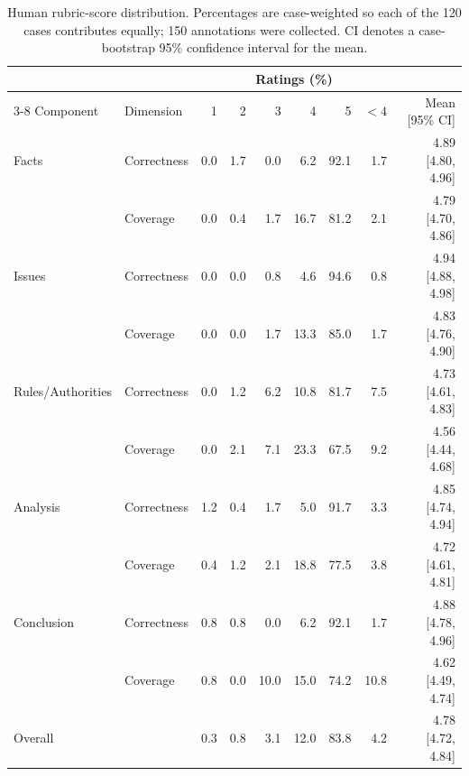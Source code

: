 \begin{table}[t]
\centering
\scriptsize
\setlength{\tabcolsep}{4pt}
\caption{Human rubric-score distribution. Percentages are case-weighted so each of the 120 cases contributes equally; 150 annotations were collected. CI denotes a case-bootstrap 95\% confidence interval for the mean.}
\label{tab:human_likert}
\begin{tabular}{@{}llrrrrrrr@{}}
\toprule
 & & \multicolumn{6}{c}{Ratings (\%)} & \\
\cmidrule(lr){3-8}
Component & Dimension & 1 & 2 & 3 & 4 & 5 & $<4$ & Mean [95\% CI] \\
\midrule
Facts & Correctness & 0.0 & 1.7 & 0.0 & 6.2 & 92.1 & 1.7 & 4.89 [4.80, 4.96] \\
 & Coverage & 0.0 & 0.4 & 1.7 & 16.7 & 81.2 & 2.1 & 4.79 [4.70, 4.86] \\
Issues & Correctness & 0.0 & 0.0 & 0.8 & 4.6 & 94.6 & 0.8 & 4.94 [4.88, 4.98] \\
 & Coverage & 0.0 & 0.0 & 1.7 & 13.3 & 85.0 & 1.7 & 4.83 [4.76, 4.90] \\
Rules/Authorities & Correctness & 0.0 & 1.2 & 6.2 & 10.8 & 81.7 & 7.5 & 4.73 [4.61, 4.83] \\
 & Coverage & 0.0 & 2.1 & 7.1 & 23.3 & 67.5 & 9.2 & 4.56 [4.44, 4.68] \\
Analysis & Correctness & 1.2 & 0.4 & 1.7 & 5.0 & 91.7 & 3.3 & 4.85 [4.74, 4.94] \\
 & Coverage & 0.4 & 1.2 & 2.1 & 18.8 & 77.5 & 3.8 & 4.72 [4.61, 4.81] \\
Conclusion & Correctness & 0.8 & 0.8 & 0.0 & 6.2 & 92.1 & 1.7 & 4.88 [4.78, 4.96] \\
 & Coverage & 0.8 & 0.0 & 10.0 & 15.0 & 74.2 & 10.8 & 4.62 [4.49, 4.74] \\
\midrule
Overall &  & 0.3 & 0.8 & 3.1 & 12.0 & 83.8 & 4.2 & 4.78 [4.72, 4.84] \\
\bottomrule
\end{tabular}
\end{table}

